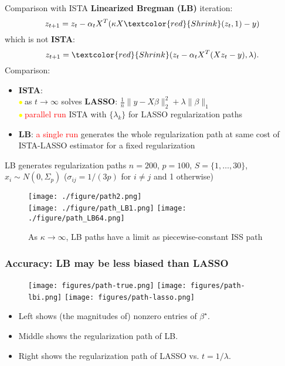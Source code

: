 \documentclass[slidestop,compress,9pt,epsfig,color]{beamer}
\theoremstyle{example}
\providecommand{\subitem}{\\ \textcolor{yellow}{$\bullet\ $}}
\begin{document}
\begin{frame}{Comparison with ISTA}
\textbf{Linearized Bregman (LB)} iteration:
\[  z_{t+1} = z_t - \alpha_t X^T ( \kappa X \textcolor{red}{Shrink}(z_t, 1) - y) \]
which is not \textbf{ISTA}:
\[ z_{t+1} = \textcolor{red}{Shrink}(z_t - \alpha_t X^T(X z_t -y), \lambda). \]
Comparison:
\begin{itemize}
\item \textbf{ISTA}: 
\subitem as $t\to\infty$ solves {\bf LASSO}: $\frac{1}{n}\|y-X\beta\|_2^2 + \lambda \|\beta\|_1$
\subitem \textcolor{red}{parallel run} ISTA with $\{\lambda_k\}$ for LASSO regularization paths
\item \textbf{LB}: \textcolor{red}{a single run} generates the whole regularization path at same cost of ISTA-LASSO estimator for a fixed regularization
\end{itemize}
\end{frame}

\begin{frame}{LB generates regularization paths}
$n=200$, $p=100$, $S=\{1,\ldots,30\}$, $x_i \sim N(0,\Sigma_p)$ ($\sigma_{ij}=1/(3p)$ for $i\neq j$ and 1 otherwise)
\begin{figure}[!t]
    \texttt{[image: ./figure/path2.png]} \\
    \texttt{[image: ./figure/path\_LB1.png]}
    \texttt{[image: ./figure/path\_LB64.png]}
   \caption{As $\kappa\to \infty$, LB paths have a limit as piecewise-constant ISS path} \label{fig:lb-paths}
\end{figure}
\end{frame}

\begin{frame}
    \frametitle{Accuracy: LB may be less biased than LASSO}
    \begin{figure}
        \centering
        \texttt{[image: figures/path-true.png]}
        \texttt{[image: figures/path-lbi.png]}
        \texttt{[image: figures/path-lasso.png]}
        \label{fig:path}
    \end{figure}
    \begin{itemize}
        \item
            Left shows (the magnitudes of) nonzero entries of $\beta^{\star}$.
        \item
            Middle shows the regularization path of LB.
        \item
            Right shows the regularization path of LASSO vs. $t=1/\lambda$.
    \end{itemize}
\end{frame}
\end{document}

